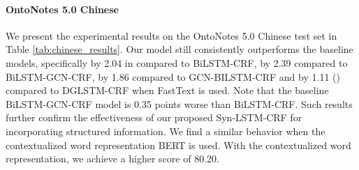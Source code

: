 \documentclass[11pt]{article}
\begin{document}
\paragraph{OntoNotes 5.0 Chinese }
We present the experimental results on the OntoNotes 5.0 Chinese test set in  Table \ref{tab:chinese_results}. 
Our model still consistently outperforms the baseline models, specifically by 2.04 in  compared to BiLSTM-CRF, by 2.39 compared to  BiLSTM-GCN-CRF, by 1.86 compared to GCN-BILSTM-CRF and by 1.11 () compared to DGLSTM-CRF when FastText  is used. Note that the baseline BiLSTM-GCN-CRF model is 0.35 points worse than  BiLSTM-CRF. 
Such results further confirm the effectiveness of our proposed Syn-LSTM-CRF for incorporating structured information. We find a similar behavior when the contextualized word representation BERT is used. With the contextualized word representation, we achieve a higher  score of 80.20.
\end{document}
